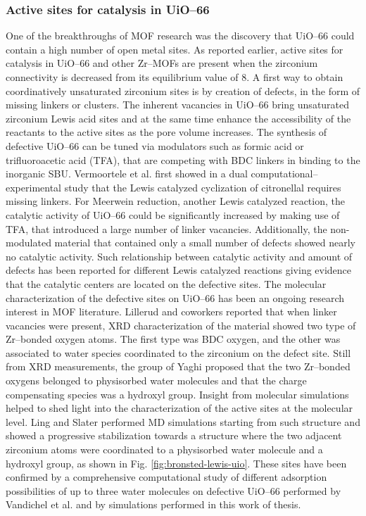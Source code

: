\subsubsection*{Active sites for catalysis in UiO--66}
One of the breakthroughs of MOF research was the discovery that UiO--66 could contain a high number of open metal sites. As reported earlier, active sites for catalysis in UiO--66 and other Zr--MOFs are present when the zirconium connectivity is decreased from its equilibrium value of 8. 
\npar
A first way to obtain coordinatively unsaturated zirconium sites is by creation of defects, in the form of missing linkers or clusters. The inherent vacancies in UiO--66 bring unsaturated zirconium Lewis acid sites\cite{wu2013unusual, shearer2014tuned, vermoortele2013synthesis, vandichel2015active, liu2016probing} and at the same time enhance the accessibility of the reactants to the active sites as the pore volume increases. The synthesis of defective UiO--66 can be tuned via modulators such as formic acid or trifluoroacetic acid (TFA), that are competing with BDC linkers in binding to the inorganic SBU. 
Vermoortele et al. first showed in a dual computational--experimental study that the Lewis catalyzed cyclization of citronellal requires missing linkers\cite{vermoortele2012electronic}. For Meerwein reduction, another Lewis catalyzed reaction, the catalytic activity of UiO--66 could be significantly increased by making use of TFA, that introduced a large number of linker vacancies. Additionally, the non-modulated material that contained only a small number of defects showed nearly no catalytic activity\cite{vermoortele2013synthesis}. Such relationship between catalytic activity and amount of defects has been reported for different Lewis catalyzed reactions giving evidence that the catalytic centers are located on the defective sites. 
\npar
The molecular characterization of the defective sites on UiO--66 has been an ongoing research interest in MOF literature. Lillerud and coworkers \cite{oien2014detailed} reported that when linker vacancies were present, XRD characterization of the material showed two type of Zr--bonded oxygen atoms. The first type was BDC oxygen, and the other was associated to water species coordinated to the zirconium on the defect site. Still from XRD measurements, the group of Yaghi \cite{trickett2015definitive} proposed that the two Zr--bonded oxygens belonged to physisorbed water molecules and that the charge compensating species was a hydroxyl group. Insight from molecular simulations helped to shed light into the characterization of the active sites at the molecular level. Ling and Slater \cite{ling2016dynamic} performed MD simulations starting from such structure and showed a progressive stabilization towards a structure where the two adjacent zirconium atoms were coordinated to a physisorbed water molecule and a hydroxyl group, as shown in Fig. \ref{fig:bronsted-lewis-uio}. These sites have been confirmed by a comprehensive computational study of different adsorption possibilities of up to three water molecules on defective UiO--66 performed by Vandichel et al. \cite{vandichel2016water} and by simulations performed in this work of thesis. 
